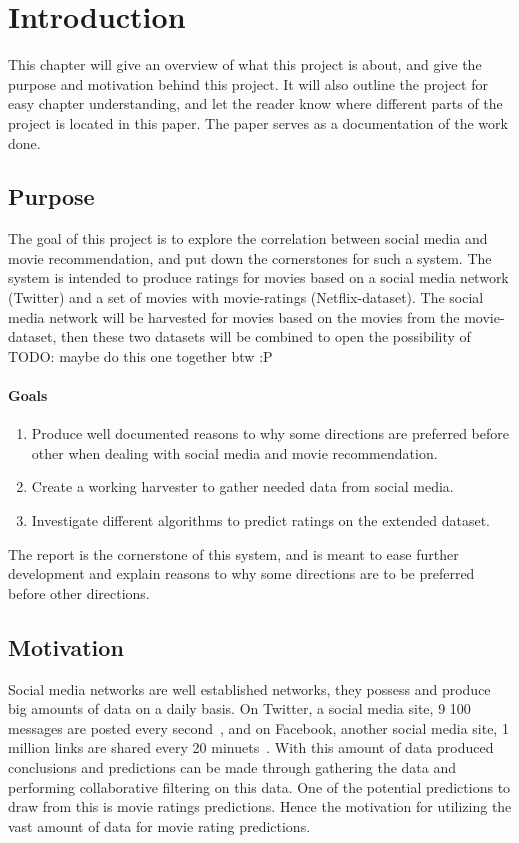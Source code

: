 
\chapter{Introduction}

\minitoc
\setcounter{page}{1}

This chapter will give an overview of what this project is about, and give the purpose and motivation behind this project. It will also outline the project for easy chapter understanding, and let the reader know where different parts of the project is located in this paper. The paper serves as a documentation of the work done.

\clearpage


\section{Purpose}
The goal of this project is to explore the correlation between social media and movie recommendation, and put down the cornerstones for such a system. The system is intended to produce ratings for movies based on a social media network (Twitter) and a set of movies with movie-ratings (Netflix-dataset). The social media network will be harvested for movies based on the movies from the movie-dataset, then these two datasets will be combined to open the possibility of TODO: maybe do this one together btw :P

\subsubsection{Goals}
\begin{enumerate}
  \item Produce well documented reasons to why some directions are preferred before other when dealing with social media and movie recommendation.
  \item Create a working harvester to gather needed data from social media.
  \item Investigate different algorithms to predict ratings on the extended dataset.
\end{enumerate}

The report is the cornerstone of this system, and is meant to ease further development and explain reasons to why some directions are to be preferred before other directions.


\section{Motivation}
Social media networks are well established networks, they possess and produce big amounts of data on a daily basis. On Twitter, a social media site, 9 100 messages are posted every second~\cite{twitt-stats}, and on Facebook, another social media site, 1 million links are shared every 20 minuets~\cite{face-stats}. With this amount of data produced conclusions and predictions can be made through gathering the data and performing collaborative filtering on this data. One of the potential predictions to draw from this is movie ratings predictions. Hence the motivation for utilizing the vast amount of data for movie rating predictions.



